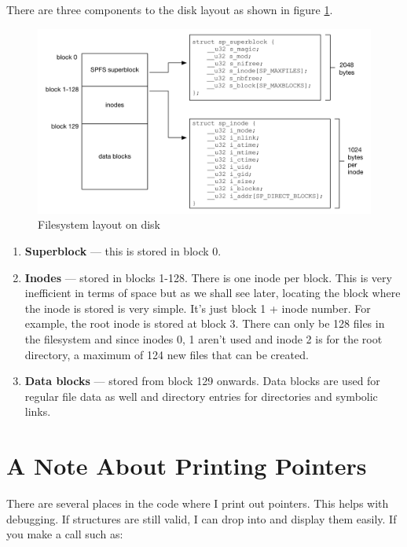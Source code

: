 There are three components to the disk layout as shown in figure \ref{fig:fslayout}.

\begin{figure}
	\centering
	\includegraphics[scale=0.56]{figures/fslayout.pdf}
	\caption{Filesystem layout on disk}
	\label{fig:fslayout}
\end{figure}

\begin{enumerate}
	\item \textbf{Superblock} --- this is stored in block 0.
	\item \textbf{Inodes} --- stored in blocks 1-128. There is one inode per block. This is very inefficient in terms of 
		space but as we shall see later, locating the block where the inode is stored is very simple. It’s just 
		block 1 + inode number. For example, the root inode is stored at block 3. There can only be 128 files in 
		the filesystem and since inodes 0, 1 aren't used and inode 2 is for the root directory, a maximum of
		124 new files that can be created.
	\item \textbf{Data blocks} --- stored from block 129 onwards. Data blocks are used for regular file data as well 
		and directory entries for directories and symbolic links. 
\end{enumerate}


\section{A Note About Printing Pointers}

There are several places in the code where I print out pointers. This helps with debugging. If structures are still valid, I can drop into  and display them easily. If you make a call such as:


